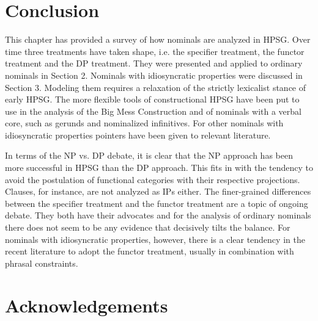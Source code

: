 \documentclass[output=paper]{langsci/langscibook}
\begin{document}
\section{Conclusion} 


This chapter has provided a survey of how nominals are analyzed in HPSG. 
Over time three treatments have taken shape, i.e. the specifier treatment, 
the functor treatment and the DP treatment. They were presented and applied to ordinary 
nominals in Section 2. Nominals with idiosyncratic properties were discussed in Section 3.
Modeling them requires a relaxation of the strictly lexicalist stance of early HPSG.  
The more flexible tools of constructional HPSG have been put to use in the analysis 
of the Big Mess Construction and of nominals with a verbal core, such as gerunds and 
nominalized infinitives. For other nominals with idiosyncratic properties pointers 
have been given to relevant literature. 

In terms of the NP vs. DP debate, it is clear that the NP approach has been 
more successful in HPSG than the DP approach. This fits in with the tendency to 
avoid the postulation of functional categories with their respective projections. 
Clauses, for instance, are not analyzed as IPs either. The finer-grained 
differences between the specifier treatment and the functor treatment are 
a topic of ongoing debate. They both have their advocates and for the analysis of 
ordinary nominals there does not seem to be any evidence that decisively tilts the balance. 
For nominals with idiosyncratic properties, however, there is a clear tendency in the recent 
literature to adopt the functor treatment, usually in combination with phrasal constraints.    


 
\section*{Acknowledgements}

\printbibliography[heading=subbibliography,notkeyword=this] 
\end{document}
